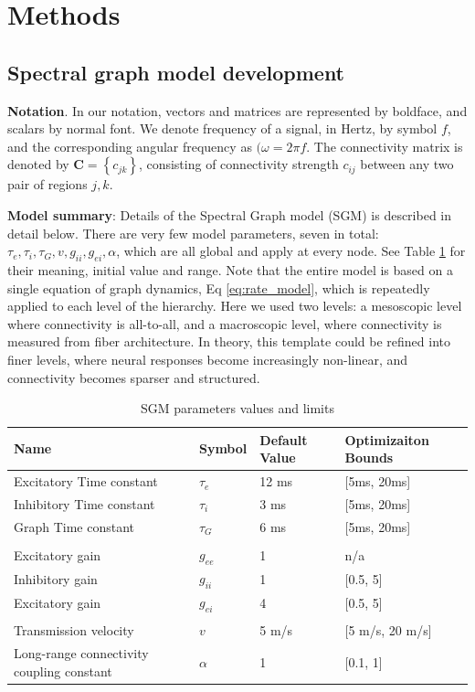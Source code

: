 \section{Methods}

\subsection{Spectral graph model development}
\textbf{Notation}. In our notation, vectors and matrices are
represented by boldface, and scalars by normal font. We denote frequency
of a signal, in Hertz, by symbol $f$, and the corresponding angular
frequency as $(\omega = 2 \pi f$. The connectivity matrix is denoted by
$\mathbf{C} = \left\{ c_{jk} \right\}$, consisting of
connectivity strength $c_{ij}$ between any two pair of regions $j,k$.

\textbf{Model summary}: Details of the Spectral Graph model (SGM) is
described in detail below. There are very few model parameters, seven in
total:
$\tau_{e}, \tau_{i}, \tau_{G}, v, g_{ii}, g_{ei}, \alpha$,
which are all global and apply at every node. See Table \ref{tab:SGM_parameters} for
their meaning, initial value and range. Note that the entire model is
based on a single equation of graph dynamics, Eq \ref{eq:rate_model}, which is
repeatedly applied to each level of the hierarchy. Here we used two
levels: a mesoscopic level where connectivity is all-to-all, and a
macroscopic level, where connectivity is measured from fiber
architecture. In theory, this template could be refined into finer
levels, where neural responses become increasingly non-linear, and
connectivity becomes sparser and structured.



\begin{table}
  \caption{SGM parameters values and limits}
  \label{tab:SGM_parameters}
  \centering
 \begin{tabular}{m{14em}|m{2cm}|m{2cm}|m{7em}}
 \hline
 Name & Symbol & Default Value & Optimizaiton Bounds \\
 \hline
 Excitatory Time constant & $ \tau_{e}$ & 12 ms & [5ms, 20ms] \\
 Inhibitory Time constant & $\tau_{i}$ & 3 ms & [5ms, 20ms] \\
 Graph Time constant & $\tau_{G}$ & 6 ms & [5ms, 20ms] \\
 \multicolumn{4}{l}{} \\
 Excitatory gain & $g_{ee}$ & 1 & n/a \\
 Inhibitory gain & $g_{ii}$ & 1 & [0.5, 5] \\
 Excitatory gain & $g_{ei}$ & 4 & [0.5, 5] \\
 \multicolumn{4}{l}{} \\
 Transmission velocity & $v$ & 5 m/s & [5 m/s, 20 m/s] \\
 Long-range connectivity coupling constant & $\alpha$ & 1 & [0.1, 1] \\
 \end{tabular}
\end{table}


